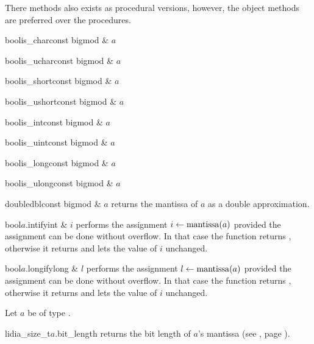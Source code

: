 There methods also exists as procedural versions, however, the object methods are preferred over
the procedures.
\begin{fcode}{bool}{is_char}{const bigmod & $a$}\end{fcode}
\begin{fcode}{bool}{is_uchar}{const bigmod & $a$}\end{fcode}
\begin{fcode}{bool}{is_short}{const bigmod & $a$}\end{fcode}
\begin{fcode}{bool}{is_ushort}{const bigmod & $a$}\end{fcode}
\begin{fcode}{bool}{is_int}{const bigmod & $a$}\end{fcode}
\begin{fcode}{bool}{is_uint}{const bigmod & $a$}\end{fcode}
\begin{fcode}{bool}{is_long}{const bigmod & $a$}\end{fcode}
\begin{fcode}{bool}{is_ulong}{const bigmod & $a$}\end{fcode}

\begin{fcode}{double}{dbl}{const bigmod & $a$}
  returns the mantissa of $a$ as a double approximation.
\end{fcode}

\begin{cfcode}{bool}{$a$.intify}{int & $i$}
  performs the assignment $i \leftarrow \operatorname{mantissa}(a)$ provided the assignment can be done without
  overflow.  In that case the function returns \FALSE, otherwise it returns \TRUE and lets the
  value of $i$ unchanged.
\end{cfcode}

\begin{cfcode}{bool}{$a$.longify}{long & $l$}
  performs the assignment $l \leftarrow \operatorname{mantissa}(a)$ provided the assignment can be done without
  overflow.  In that case the function returns \FALSE, otherwise it returns \TRUE and lets the
  value of $i$ unchanged.
\end{cfcode}



\BASIC

Let $a$ be of type .

\begin{cfcode}{lidia_size_t}{$a$.bit_length}{}
  returns the bit length of $a$'s mantissa (see , page \pageref{class:bigint}).
\end{cfcode}

